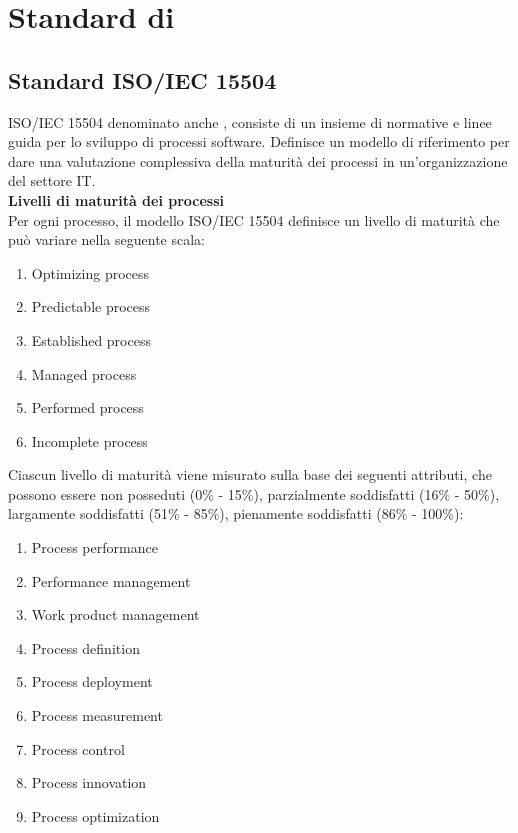 \section{Standard di } 
\subsection{Standard ISO/IEC 15504}\label{AppQualitaProcessi}
ISO/IEC 15504 denominato anche \textbf{}, consiste di un insieme di normative e linee guida per lo sviluppo di processi software.
Definisce un modello di riferimento per dare una valutazione complessiva della maturità dei processi in un'organizzazione del settore IT.\\
\textbf{Livelli di maturità dei processi}\\
Per ogni processo, il modello ISO/IEC 15504 definisce un livello di maturità che può variare nella seguente scala:
\begin{enumerate}
\item Optimizing process
\item Predictable process
\item Established process
\item Managed process
\item Performed process
\item Incomplete process
\end{enumerate}
Ciascun livello di maturità viene misurato sulla base dei seguenti attributi, che possono essere non posseduti (0\% - 15\%), parzialmente soddisfatti (16\% - 50\%), largamente soddisfatti (51\% - 85\%), pienamente soddisfatti (86\% - 100\%):
\begin{enumerate}
\item Process performance
\item Performance management
\item Work product management
\item Process definition
\item Process deployment
\item Process measurement
\item Process control
\item Process innovation
\item Process optimization
\end{enumerate}
